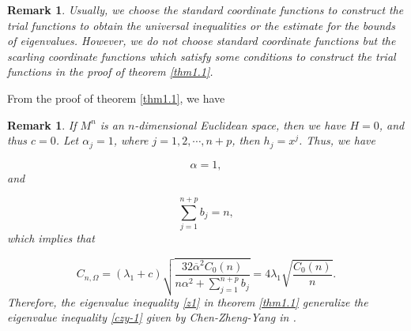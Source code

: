 \documentclass[12pt]{article}
\newtheorem{rem}[thm]{Remark}
\numberwithin{equation}{section}
\begin{document}
\begin{rem}Usually, we choose the standard coordinate functions to construct the trial functions to obtain the universal inequalities
or the estimate for the bounds of eigenvalues. However, we do not choose standard coordinate functions but the scarling coordinate functions which satisfy some conditions  to construct the trial functions in the proof of theorem \ref{thm1.1}.\end{rem}
From the proof of theorem \ref{thm1.1}, we have


\begin{rem}If $M^{n}$ is an $n$-dimensional Euclidean space, then we have $H=0$, and thus $c=0$. Let $\alpha_{j}=1$, where $j=1,2,\cdots,n+p$, then $h_{j}=x^{j}$. Thus, we have

$$\alpha=1,$$ and

$$\sum_{j=1}^{n+p}b_{j}=n,$$which implies that

$$C_{n,\Omega}=(\lambda_{1}+c)\sqrt{\frac{32\overline{\alpha}^{2}C_{0}(n)}{n\alpha^{2}+\sum_{j=1}^{n+p}b_{j}}}
=4\lambda_{1}\sqrt{\frac{C_{0}(n)}{n}}.$$
Therefore, the eigenvalue inequality \eqref {z1} in theorem \ref{thm1.1} generalize the eigenvalue inequality \eqref{czy-1} given by Chen-Zheng-Yang in { \rm \cite{CZY}}.
\end{rem}
\end{document}

